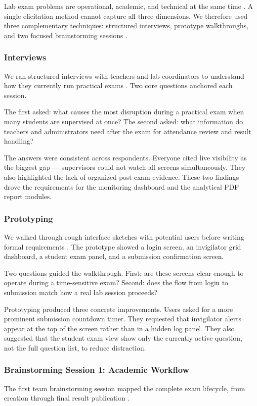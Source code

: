 Lab exam problems are operational, academic, and technical at the same time \cite{elicit1}. A single elicitation method cannot capture all three dimensions. We therefore used three complementary techniques: structured interviews, prototype walkthroughs, and two focused brainstorming sessions \cite{sommerville}.

\subsubsection{Interviews}
We ran structured interviews with teachers and lab coordinators to understand how they currently run practical exams \cite{elicit1}. Two core questions anchored each session.

The first asked: what causes the most disruption during a practical exam when many students are supervised at once? The second asked: what information do teachers and administrators need after the exam for attendance review and result handling?

The answers were consistent across respondents. Everyone cited live visibility as the biggest gap — supervisors could not watch all screens simultaneously. They also highlighted the lack of organized post-exam evidence. These two findings drove the requirements for the monitoring dashboard and the analytical PDF report modules.

\subsubsection{Prototyping}
We walked through rough interface sketches with potential users before writing formal requirements \cite{sommerville}. The prototype showed a login screen, an invigilator grid dashboard, a student exam panel, and a submission confirmation screen.

Two questions guided the walkthrough. First: are these screens clear enough to operate during a time-sensitive exam? Second: does the flow from login to submission match how a real lab session proceeds?

Prototyping produced three concrete improvements. Users asked for a more prominent submission countdown timer. They requested that invigilator alerts appear at the top of the screen rather than in a hidden log panel. They also suggested that the student exam view show only the currently active question, not the full question list, to reduce distraction.

\subsubsection{Brainstorming Session 1: Academic Workflow}
The first team brainstorming session mapped the complete exam lifecycle, from creation through final result publication \cite{elicit1}.

